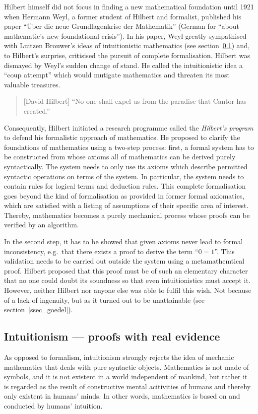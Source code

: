 \documentclass[hidelinks]{article}
\theoremstyle{plain}
\theoremstyle{definition}
\theoremstyle{rem}
\begin{document}
Hilbert himself did not focus in finding a new mathematical foundation until 1921 when Hermann Weyl, a former student of Hilbert and formalist, published his paper ``Über die neue Grundlagenkrise der Mathematik'' (German for ``about mathematic's new foundational crisis''). In his paper, Weyl greatly sympathised with Luitzen Brouwer's ideas of intuitionistic mathematics (see section~\ref{ssec_intuitionism}) and, to Hilbert's surprise, critisised the pursuit of complete formalisation. Hilbert was dismayed by Weyl's sudden change of stand. He called the intuitionistic idea a ``coup attempt'' which would mutigate mathematics and threaten its most valuable treasures.\cite{hilbert_coup}
\begin{quote}[David Hilbert]
``No one shall expel us from the paradise that Cantor has created.''\cite{hilbert_paradise}
\end{quote}
Consequently, Hilbert initiated a research programme called the \textit{Hilbert's program} to defend his formalistic approach of mathematics. He proposed to clarify the foundations of mathematics using a two-step process: first, a formal system has to be constructed from whose axioms all of mathematics can be derived purely syntactically. The system needs to only use its axioms which describe permitted syntactic operations on terms of the system. In particular, the system needs to contain rules for logical terms and deduction rules. This complete formalisation goes beyond the kind of formalisation as provided in former formal axiomatics, which are satisfied with a listing of assumptions of their specific area of interest. Thereby, mathematics becomes a purely mechanical process whose proofs can be verified by an algorithm.

In the second step, it has to be showed that given axioms never lead to formal inconsistency, e.g.\ that there exists a proof to derive the term ``$0=1$''. This validation needs to be carried out outside the system using a metamathemtical proof. Hilbert proposed that this proof must be of such an elementary character that no one could doubt its soundness so that even intuitionistics must accept it. However, neither Hilbert nor anyone else was able to fulfil this wish. Not because of a lack of ingenuity, but as it turned out to be unattainable (see section~\ref{ssec_goedel}).

\subsection{Intuitionism --- proofs with real evidence}\label{ssec_intuitionism}
As opposed to formalism, intuitionism strongly rejects the idea of mechanic mathematics that deals with pure syntactic objects. Mathematics is not made of symbols, and it is not existent in a world independent of mankind, but rather it is regarded as the result of constructive mental acitivities of humans and thereby only existent in humans' minds. In other words, mathematics is based on and conducted by humans' intuition.
\end{document}
